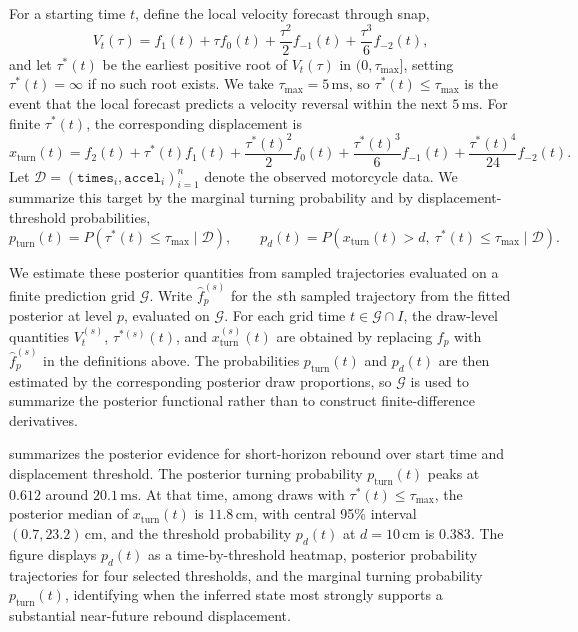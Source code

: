 \documentclass[11pt,a4paper]{article}
\theoremstyle{definition}
\theoremstyle{remark}
\begin{document}
For a starting time \(t\), define the local velocity forecast through snap,
\[
V_t(\tau)=
f_1(t)+\tau f_0(t)+\frac{\tau^2}{2}f_{-1}(t)+\frac{\tau^3}{6}f_{-2}(t),
\]
and let \(\tau^{\ast}(t)\) be the earliest positive root of \(V_t(\tau)\) in \((0,\tau_{\max}]\), setting \(\tau^{\ast}(t)=\infty\) if no such root exists. We take \(\tau_{\max}=5\,\mathrm{ms}\), so \(\tau^{\ast}(t)\le \tau_{\max}\) is the event that the local forecast predicts a velocity reversal within the next \(5\,\mathrm{ms}\). For finite \(\tau^{\ast}(t)\), the corresponding displacement is
\[
x_{\mathrm{turn}}(t)=
f_2(t)+\tau^{\ast}(t)f_1(t)+\frac{\tau^{\ast}(t)^2}{2}f_0(t)+\frac{\tau^{\ast}(t)^3}{6}f_{-1}(t)+\frac{\tau^{\ast}(t)^4}{24}f_{-2}(t).
\]
Let \(\mathcal D=(\texttt{times}_i,\texttt{accel}_i)_{i=1}^n\) denote the observed motorcycle data. We summarize this target by the marginal turning probability and by displacement-threshold probabilities,
\[
p_{\mathrm{turn}}(t)=P(\tau^\ast(t)\le\tau_{\max}\mid \mathcal D),
\qquad
p_d(t)=P(x_{\mathrm{turn}}(t)>d,\ \tau^\ast(t)\le\tau_{\max}\mid \mathcal D).
\]

We estimate these posterior quantities from sampled trajectories evaluated on a finite prediction grid \(\mathcal G\). Write \(\widehat f_p^{(s)}\) for the \(s\)th sampled trajectory from the fitted posterior at level \(p\), evaluated on \(\mathcal G\). For each grid time \(t\in\mathcal G\cap I\), the draw-level quantities \(V_t^{(s)}\), \(\tau^{\ast(s)}(t)\), and \(x_{\mathrm{turn}}^{(s)}(t)\) are obtained by replacing \(f_p\) with \(\widehat f_p^{(s)}\) in the definitions above. The probabilities \(p_{\mathrm{turn}}(t)\) and \(p_d(t)\) are then estimated by the corresponding posterior draw proportions, so \(\mathcal G\) is used to summarize the posterior functional rather than to construct finite-difference derivatives.

 summarizes the posterior evidence for short-horizon rebound over start time and displacement threshold. The posterior turning probability \(p_{\mathrm{turn}}(t)\) peaks at \(0.612\) around \(20.1\,\mathrm{ms}\). At that time, among draws with \(\tau^\ast(t)\le\tau_{\max}\), the posterior median of \(x_{\mathrm{turn}}(t)\) is \(11.8\,\mathrm{cm}\), with central 95\% interval \((0.7,23.2)\,\mathrm{cm}\), and the threshold probability \(p_d(t)\) at \(d=10\,\mathrm{cm}\) is \(0.383\). The figure displays \(p_d(t)\) as a time-by-threshold heatmap, posterior probability trajectories for four selected thresholds, and the marginal turning probability \(p_{\mathrm{turn}}(t)\), identifying when the inferred state most strongly supports a substantial near-future rebound displacement.
\end{document}

